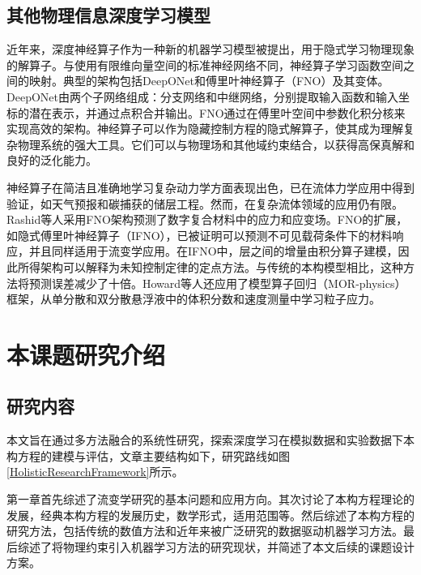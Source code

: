 \subsection{其他物理信息深度学习模型}
近年来，深度神经算子作为一种新的机器学习模型被提出，用于隐式学习物理现象的解算子\cite{luLearningNonlinearOperators2021}。与使用有限维向量空间的标准神经网络不同，神经算子学习函数空间之间的映射。典型的架构包括DeepONet和傅里叶神经算子（FNO）及其变体。DeepONet由两个子网络组成：分支网络和中继网络，分别提取输入函数和输入坐标的潜在表示，并通过点积合并输出。FNO通过在傅里叶空间中参数化积分核来实现高效的架构。神经算子可以作为隐藏控制方程的隐式解算子，使其成为理解复杂物理系统的强大工具。它们可以与物理场和其他域约束结合，以获得高保真解和良好的泛化能力。

神经算子在简洁且准确地学习复杂动力学方面表现出色，已在流体力学应用中得到验证，如天气预报和碳捕获的储层工程。然而，在复杂流体领域的应用仍有限。Rashid等人采用FNO架构预测了数字复合材料中的应力和应变场\cite{rashid2022learning}。FNO的扩展，如隐式傅里叶神经算子（IFNO），已被证明可以预测不可见载荷条件下的材料响应，并且同样适用于流变学应用\cite{you2022learning}。在IFNO中，层之间的增量由积分算子建模，因此所得架构可以解释为未知控制定律的定点方法。与传统的本构模型相比，这种方法将预测误差减少了十倍。Howard等人还应用了模型算子回归（MOR-physics）框架，从单分散和双分散悬浮液中的体积分数和速度测量中学习粒子应力\cite{howardMachineLearningMethods2023}。

\section{本课题研究介绍}
\subsection{研究内容}
本文旨在通过多方法融合的系统性研究，探索深度学习在模拟数据和实验数据下本构方程的建模与评估，文章主要结构如下，研究路线如图\ref{HolisticResearchFramework}所示。

第一章首先综述了流变学研究的基本问题和应用方向。其次讨论了本构方程理论的发展，经典本构方程的发展历史，数学形式，适用范围等。然后综述了本构方程的研究方法，包括传统的数值方法和近年来被广泛研究的数据驱动机器学习方法。最后综述了将物理约束引入机器学习方法的研究现状，并简述了本文后续的课题设计方案。

